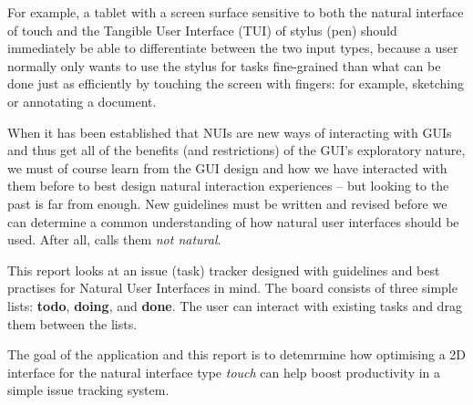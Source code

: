 For example, a tablet with a screen surface sensitive to both the natural interface of touch and the Tangible User Interface (TUI) \autocite{ishii-ullmer:tangible-bits-towards-seamless-interfaces-between-people-bits-and-atoms:1997} of stylus (pen) should immediately be able to differentiate between the two input types, because a user normally only wants to use the stylus for tasks fine-grained than what can be done just as efficiently by touching the screen with fingers: for example, sketching or annotating a document.

When it has been established that NUIs are new ways of interacting with GUIs and thus get all of the benefits (and restrictions) of the GUI's exploratory nature, we must of course learn from the GUI design and how we have interacted with them before to best design natural interaction experiences -- but looking to the past is far from enough. New guidelines must be written and revised before we can determine a common understanding of how natural user interfaces should be used. After all, \textcite{norman:natural-user-interfaces-are-not-natural:2010} calls them \textit{not natural}.

This report looks at an issue (task) tracker designed with guidelines and best practises for Natural User Interfaces in mind.  The board consists of three simple lists: \textbf{todo}, \textbf{doing}, and \textbf{done}. The user can interact with existing tasks and drag them between the lists.

The goal of the application and this report is to detemrmine how optimising a 2D interface for the natural interface type \textit{touch} can help boost productivity in a simple issue tracking system.
